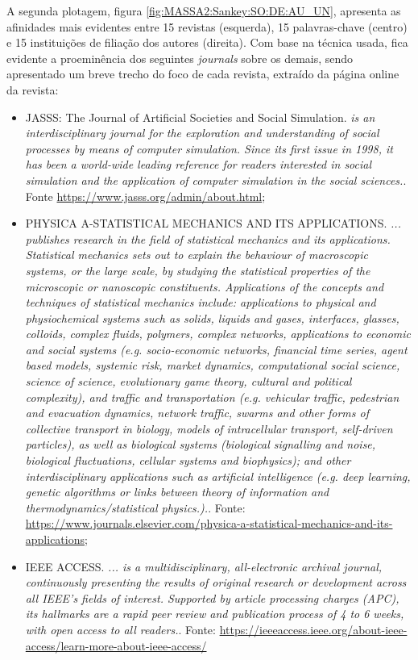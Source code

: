 A segunda plotagem, figura \ref{fig:MASSA2:Sankey:SO:DE:AU_UN}, apresenta as afinidades mais evidentes entre 15 revistas (esquerda), 15 palavras-chave (centro) e 15 instituições de filiação dos autores (direita). Com base na técnica usada, fica evidente a proeminência dos seguintes \textit{journals} sobre os demais, sendo apresentado um breve trecho do foco de cada revista, extraído da página online da revista:
\begin{itemize}
    \item JASSS: The Journal of Artificial Societies and Social Simulation. \textit{\small  is an interdisciplinary journal for the exploration and understanding of social processes by means of computer simulation. Since its first issue in 1998, it has been a world-wide leading reference for readers interested in social simulation and the application of computer simulation in the social sciences.}. Fonte \url{https://www.jasss.org/admin/about.html};
    \item PHYSICA A-STATISTICAL MECHANICS AND ITS APPLICATIONS. \textit{\small ... publishes research in the field of statistical mechanics and its applications. Statistical mechanics sets out to explain the behaviour of macroscopic systems, or the large scale, by studying the statistical properties of the microscopic or nanoscopic constituents. Applications of the concepts and techniques of statistical mechanics include: applications to physical and physiochemical systems such as solids, liquids and gases, interfaces, glasses, colloids, complex fluids, polymers, complex networks, applications to economic and social systems (e.g. socio-economic networks, financial time series, agent based models, systemic risk, market dynamics, computational social science, science of science, evolutionary game theory, cultural and political complexity), and traffic and transportation (e.g. vehicular traffic, pedestrian and evacuation dynamics, network traffic, swarms and other forms of collective transport in biology, models of intracellular transport, self-driven particles), as well as biological systems (biological signalling and noise, biological fluctuations, cellular systems and biophysics); and other interdisciplinary applications such as artificial intelligence (e.g. deep learning, genetic algorithms or links between theory of information and thermodynamics/statistical physics.).}. Fonte: \url{https://www.journals.elsevier.com/physica-a-statistical-mechanics-and-its-applications};
    \item IEEE ACCESS. \textit{\small ... is a multidisciplinary, all-electronic archival journal, continuously presenting the results of original research or development across all IEEE’s fields of interest. Supported by article processing charges (APC), its hallmarks are a rapid peer review and publication process of 4 to 6 weeks, with open access to all readers.}. Fonte: \url{https://ieeeaccess.ieee.org/about-ieee-access/learn-more-about-ieee-access/}
\end{itemize} 

